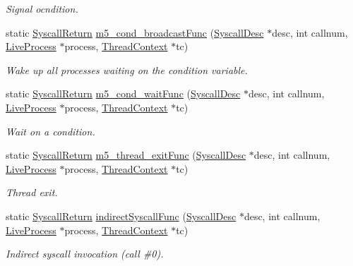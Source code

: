 \begin{DoxyCompactItemize}
\begin{DoxyCompactList}\small\item\em Signal ocndition. \item\end{DoxyCompactList}\item 
static \hyperlink{classSyscallReturn}{SyscallReturn} \hyperlink{classTru64_a0553f30a35d45bbc6ba7fd2120332c9c}{m5\_\-cond\_\-broadcastFunc} (\hyperlink{classSyscallDesc}{SyscallDesc} $\ast$desc, int callnum, \hyperlink{classLiveProcess}{LiveProcess} $\ast$process, \hyperlink{classThreadContext}{ThreadContext} $\ast$tc)
\begin{DoxyCompactList}\small\item\em Wake up all processes waiting on the condition variable. \item\end{DoxyCompactList}\item 
static \hyperlink{classSyscallReturn}{SyscallReturn} \hyperlink{classTru64_a2c38b28b551cfcfe04f70cbfbff3a55e}{m5\_\-cond\_\-waitFunc} (\hyperlink{classSyscallDesc}{SyscallDesc} $\ast$desc, int callnum, \hyperlink{classLiveProcess}{LiveProcess} $\ast$process, \hyperlink{classThreadContext}{ThreadContext} $\ast$tc)
\begin{DoxyCompactList}\small\item\em Wait on a condition. \item\end{DoxyCompactList}\item 
static \hyperlink{classSyscallReturn}{SyscallReturn} \hyperlink{classTru64_a56f0a437d8a86b1220497375406a3f78}{m5\_\-thread\_\-exitFunc} (\hyperlink{classSyscallDesc}{SyscallDesc} $\ast$desc, int callnum, \hyperlink{classLiveProcess}{LiveProcess} $\ast$process, \hyperlink{classThreadContext}{ThreadContext} $\ast$tc)
\begin{DoxyCompactList}\small\item\em Thread exit. \item\end{DoxyCompactList}\item 
static \hyperlink{classSyscallReturn}{SyscallReturn} \hyperlink{classTru64_a82607daf4ef0639e0013656b0c861927}{indirectSyscallFunc} (\hyperlink{classSyscallDesc}{SyscallDesc} $\ast$desc, int callnum, \hyperlink{classLiveProcess}{LiveProcess} $\ast$process, \hyperlink{classThreadContext}{ThreadContext} $\ast$tc)
\begin{DoxyCompactList}\small\item\em Indirect syscall invocation (call \#0). \item\end{DoxyCompactList}\end{DoxyCompactItemize}
